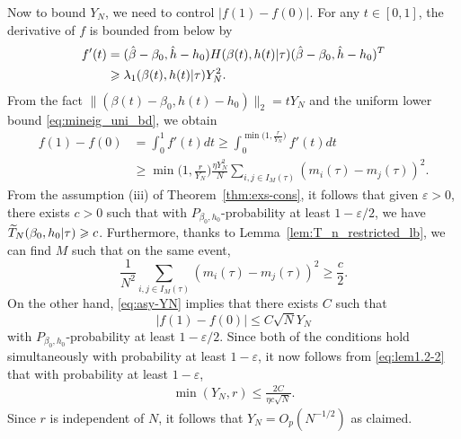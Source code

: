 \documentclass[letterpaper,11pt,reqno]{amsart}
\renewcommand{\le}{\leqslant}
\renewcommand{\ge}{\geqslant}
\renewcommand{\geq}{\geqslant}
\newcommand{\eps}{\varepsilon}
\newcommand{\abs}[1]{\left\vert#1\right\vert}
\newcommand{\mvgt}{{\tau}}
\begin{document}
Now to bound $Y_N$, we need to control $\abs{f(1) - f(0)}$.
For any $t\in[0,1]$, the derivative of $f$ is bounded from below by
\begin{align*}
    f'(t) &= (\hat{\gb}-\gb_0, \hat{h}-h_0)  H(\gb(t),h(t)|\mvgt)   (\hat{\gb}-\gb_0, \hat{h}-h_0)^T \\
    &\geq \gl_1(\gb(t),h(t)|\mvgt) Y_N^2.
\end{align*}
From the fact $\| (\beta(t) - \beta_0,  h(t) - h_0)\|_2  = t Y_N $ and 
the uniform lower bound \eqref{eq:mineig_uni_bd}, we obtain 
\begin{align}\label{eq:lem1.2-2}
    f(1)-f(0) &= \int_0^1 f'(t) dt \ge \int_{0}^{\min \big( 1, \frac{r}{Y_N}\big) } f'(t) dt \nonumber \\
    &\ge \min \big( 1, \frac{r}{Y_N}\big)    \frac{\eta Y_N^2}{N} \sum_{i, j \in I_M(\mvgt)} (m_i(\mvgt)-m_j(\mvgt))^2.
\end{align}
From the assumption (iii) of Theorem~\ref{thm:exs-cons}, it follows that given $\eps >0$, there exists $c>0$ such that with $P_{\beta_0, h_0}$-probability at least $1- \eps/2$, we have $\widetilde{T}_N(\gb_0,h_0|\mvgt) \ge c$.
Furthermore, thanks to Lemma~\ref{lem:T_n_restricted_lb}, we can find  $M$ such that on the same event,
\[ \frac{1}{N^2} \sum_{i, j \in I_M(\mvgt)} (m_i(\mvgt)-m_j(\mvgt))^2 \ge \frac{c}{2}.\]
On the other hand, \eqref{eq:asy-YN} implies that there exists $C$ such that 
\[ | f(1)  -  f(0)| \le C \sqrt{N} Y_N\]
with $P_{\beta_0, h_0}$-probability at least $1- \eps/2$. Since both of the conditions hold simultaneously with probability at least $1-\eps$,
it now follows from \eqref{eq:lem1.2-2} that with probability at least $1-\eps$,
\begin{align*}
\min(Y_N, r) \le \frac{2C}{\eta c\sqrt{N}}.
\end{align*}
Since $r$ is independent of $N$, it follows that
$Y_N  = O_p(N^{-1/2})$ as claimed. 


 
\end{document}
